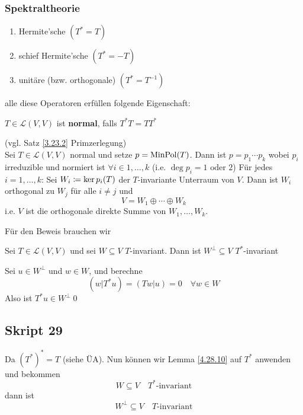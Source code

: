 \subsubsection{Spektraltheorie}
\begin{enumerate}[label=(\alph*)]
	\item Hermite'sche $ (T^* = T) $ 
	\item schief Hermite'sche $ (T^* = -T) $ 
	\item unitäre (bzw. orthogonale) $ (T^* = T^{-1})  $
\end{enumerate}
alle diese Operatoren erfüllen folgende Eigenschaft:

\begin{subdefinition}
	$ T \in \mathcal{L} (V, V) $ ist \textbf{normal}, falls $ T^* T = T T^* $
\end{subdefinition}

\begin{subtheorem}
	(vgl. Satz \ref{3.23.2} Primzerlegung)\\
	Sei $ T \in \mathcal{L} (V, V) $ normal und setze $ p = \operatorname{Min Pol}(T) $.
	Dann ist $ p = p_1 \dotsb p_k $ wobei $ p_i $ irreduzible und normiert ist $ \forall i \in 1, \dotsc, k $ (i.e. $ \deg p_i = \text{1 oder 2} $)
	Für jedes $ i = 1, \dotsc, k $: Sei $ W_i \coloneqq \operatorname{ker} p_i (T) $ der $ T $-invariante Unterraum von $ V $.
	Dann ist $ W_i $ orthogonal zu $ W_j $ für alle $ i \neq j $ und
	\[
		V = W_1 \oplus \dotsb \oplus W_k
	\]
	i.e. $ V $ ist die orthogonale direkte Summe von $ W_1, \dotsc, W_k $.
\end{subtheorem}
Für den Beweis brauchen wir
\begin{sublemma}
	Sei $ T \in \mathcal{L} (V, V) $ und sei $ W \subseteq V $ $ T $-invariant.
	Dann ist $ W^\perp \subseteq V $ $ T^* $-invariant
\end{sublemma}
\begin{subproof*}
	Sei $ u \in W^\perp $ und $ w \in W $, und berechne
	\[
		(w | T^*u) = (Tw|u) = 0 \quad \forall w \in W
	\]
	Also ist $ T^*u \in W^\perp $\qed
\end{subproof*}

\subsection{Skript 29}

\begin{subnote}
	Da $ (T^*)^* = T $ (siehe ÜA).
	Nun können wir Lemma \ref{4.28.10} auf $ T^* $ anwenden und bekommen
	\[
		W \subseteq V \quad T^*\text{-invariant} 
	\]
	dann ist
	\[
		W^\perp \subseteq V \quad T \text{-invariant} 
	\]
\end{subnote}

